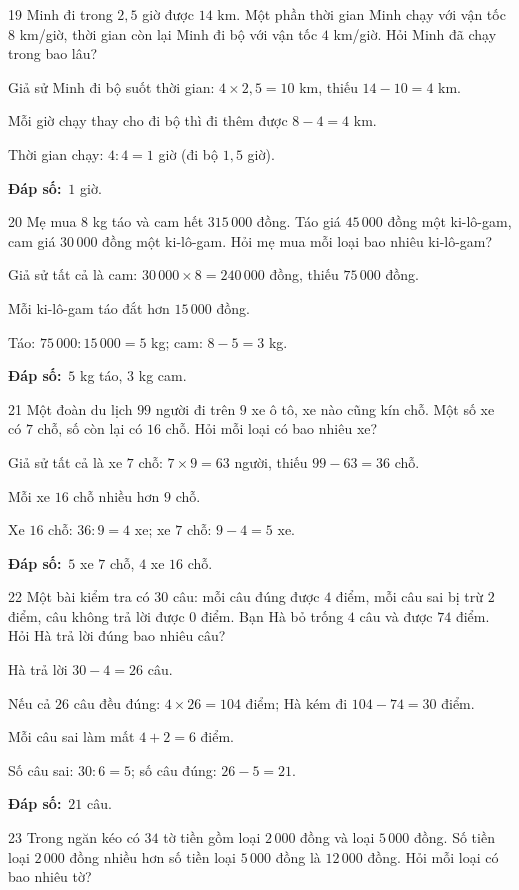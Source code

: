 \documentclass[11pt]{article}
\newif\ifsol \solfalse
\providecommand{\AnsWord}{Đáp số}
\newcommand{\dapso}[1]{\par\textbf{\AnsWord:}\ #1}
\newcommand{\probsol}[1]{%
  \begin{lrbox}{\solmeasure}\begin{minipage}{\dimexpr\linewidth-24pt\relax}#1\end{minipage}\end{lrbox}%
  \ifsol
    \begin{solbox}#1\end{solbox}%
  \else
    \setlength{\solht}{\dimexpr\ht\solmeasure+\dp\solmeasure+0.85cm\relax}%
    \ifdim\solht<1.35cm\setlength{\solht}{1.35cm}\fi
    \begin{tcolorbox}[colback=white,colframe=Line,boxrule=0.8pt,arc=5pt,
      left=8pt,right=8pt,top=4pt,bottom=4pt,height=\solht]{\footnotesize\color{Slate}\itshape\WorkWord}\end{tcolorbox}%
  \fi}
\newcommand{\gap}{\vspace{0.3cm}}
\def\WorkWord{Bài làm:}
\def\AnsWord{Đáp số}
\begin{document}
\gap
\begin{probbox}{19}{\relax}
Minh đi trong $2{,}5$ giờ được $14$ km. Một phần thời gian Minh chạy với vận tốc $8$ km/giờ, thời gian còn lại Minh đi bộ với vận tốc $4$ km/giờ. Hỏi Minh đã chạy trong bao lâu?
\end{probbox}
\probsol{
Giả sử Minh đi bộ suốt thời gian: $4\times2{,}5=10$ km, thiếu $14-10=4$ km.\par
Mỗi giờ chạy thay cho đi bộ thì đi thêm được $8-4=4$ km.\par
Thời gian chạy: $4:4=1$ giờ (đi bộ $1{,}5$ giờ).
\dapso{$1$ giờ.}}
\gap
\begin{probbox}{20}{\relax}
Mẹ mua $8$ kg táo và cam hết $315\,000$ đồng. Táo giá $45\,000$ đồng một ki-lô-gam, cam giá $30\,000$ đồng một ki-lô-gam. Hỏi mẹ mua mỗi loại bao nhiêu ki-lô-gam?
\end{probbox}
\probsol{
Giả sử tất cả là cam: $30\,000\times8=240\,000$ đồng, thiếu $75\,000$ đồng.\par
Mỗi ki-lô-gam táo đắt hơn $15\,000$ đồng.\par
Táo: $75\,000:15\,000=5$ kg; cam: $8-5=3$ kg.
\dapso{$5$ kg táo, $3$ kg cam.}}
\gap
\begin{probbox}{21}{\relax}
Một đoàn du lịch $99$ người đi trên $9$ xe ô tô, xe nào cũng kín chỗ. Một số xe có $7$ chỗ, số còn lại có $16$ chỗ. Hỏi mỗi loại có bao nhiêu xe?
\end{probbox}
\probsol{
Giả sử tất cả là xe $7$ chỗ: $7\times9=63$ người, thiếu $99-63=36$ chỗ.\par
Mỗi xe $16$ chỗ nhiều hơn $9$ chỗ.\par Xe $16$ chỗ: $36:9=4$ xe; xe $7$ chỗ: $9-4=5$ xe.
\dapso{$5$ xe $7$ chỗ, $4$ xe $16$ chỗ.}}
\gap
\begin{probbox}{22}{\relax}
Một bài kiểm tra có $30$ câu: mỗi câu đúng được $4$ điểm, mỗi câu sai bị trừ $2$ điểm, câu không trả lời được $0$ điểm. Bạn Hà bỏ trống $4$ câu và được $74$ điểm. Hỏi Hà trả lời đúng bao nhiêu câu?
\end{probbox}
\probsol{
Hà trả lời $30-4=26$ câu.\par Nếu cả $26$ câu đều đúng: $4\times26=104$ điểm; Hà kém đi $104-74=30$ điểm.\par
Mỗi câu sai làm mất $4+2=6$ điểm.\par Số câu sai: $30:6=5$; số câu đúng: $26-5=21$.
\dapso{$21$ câu.}}
\gap
\begin{probbox}{23}{\relax}
Trong ngăn kéo có $34$ tờ tiền gồm loại $2\,000$ đồng và loại $5\,000$ đồng. Số tiền loại $2\,000$ đồng nhiều hơn số tiền loại $5\,000$ đồng là $12\,000$ đồng. Hỏi mỗi loại có bao nhiêu tờ?
\end{probbox}
\end{document}
